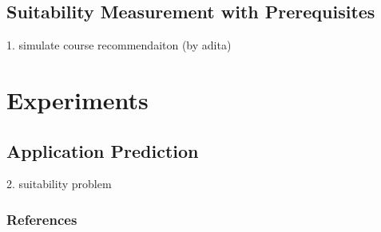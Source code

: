 \documentclass{article} %
\begin{document}
 

\subsection{Suitability Measurement with Prerequisites}
1. simulate course recommendaiton (by adita)

\subsection{}

\subsection{}

\section{Experiments}
\subsection{Application Prediction}
2. suitability problem 


\subsubsection*{References}
\end{document}
